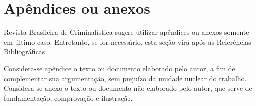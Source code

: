 \documentclass{RBClatex}
\begin{document}



%
%


\section*{Apêndices ou anexos}

Revista Brasileira de Criminalística sugere utilizar apêndices ou anexos somente em último caso. Entretanto, se for necessário, esta seção virá após as Referências Bibliográficas.

Considera-se apêndice o texto ou documento elaborado pelo autor, a fim de complementar sua argumentação, sem prejuízo da unidade nuclear do trabalho. Considera-se anexo o texto ou documento não elaborado pelo autor, que serve de fundamentação, comprovação e ilustração.
\end{document}
